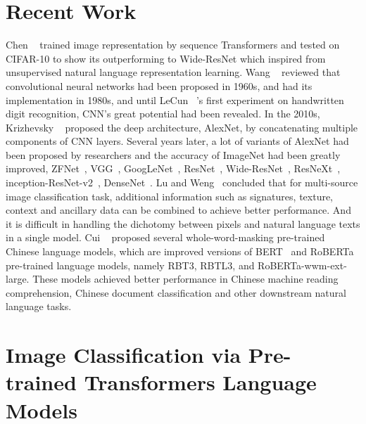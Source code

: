 \documentclass[review]{cvpr}
\begin{document}

\section{Recent Work}

  Chen \etal~\cite{chen2020generative} trained image representation by sequence Transformers and tested on CIFAR-10 to show its outperforming to Wide-ResNet
which inspired from unsupervised natural language representation learning.
  Wang \etal~\cite{wang2019development} reviewed that convolutional neural networks had been proposed in 1960s, and had its implementation in 1980s,
and until LeCun \etal~\cite{lecun1990handwritten}'s first experiment on handwritten digit recognition, CNN's great potential had been revealed.
  In the 2010s, Krizhevsky \etal~\cite{krizhevsky2012imagenet} proposed the deep architecture, AlexNet, by concatenating multiple components of CNN layers.
Several years later, a lot of variants of AlexNet had been proposed by researchers and the accuracy of ImageNet had been greatly improved, \eg ZFNet~\cite{zeiler2014visualizing}, VGG~\cite{simonyan2014very}, GoogLeNet~\cite{szegedy2015going}, ResNet~\cite{he2016deep},
Wide-ResNet~\cite{zagoruyko2016wide}, ResNeXt~\cite{xie2017aggregated}, inception-ResNet-v2~\cite{szegedy2016inception}, DenseNet~\cite{huang2016deep}.
  Lu and Weng~\cite{lu2007survey} concluded that for multi-source image classification task, additional information such as signatures, texture, context and ancillary data can be combined to achieve better performance.
And it is difficult in handling the dichotomy between pixels and natural language texts in a single model.
  Cui \etal~\cite{cui2019pre, cui2020revisiting} proposed several whole-word-masking pre-trained Chinese language models,
which are improved versions of BERT~\cite{devlin2018bert} and RoBERTa~\cite{liu2019roberta} pre-trained language models, namely RBT3, RBTL3, and RoBERTa-wwm-ext-large.
These models achieved better performance in Chinese machine reading comprehension, Chinese document classification and other downstream natural language tasks.


\section{Image Classification via Pre-trained Transformers Language Models}
\end{document}

